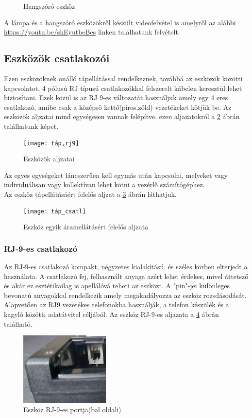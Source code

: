 \documentclass[tocnopagenum]{thesis-ekf}
\theoremstyle{definition}
\theoremstyle{remark}
\begin{document}
\begin{figure}[H]
		\caption[Hangszóró eszköz]{Hangszóró eszköz}
		\label{fig:hangsz01}
	\end{figure}
A lámpa és a hangszóró eszközökről készült videofelvétel is amelyről az alábbi \url{https://youtu.be/shEyutbeBes} linken találhatunk felvételt.
	\subsection{Eszközök csatlakozói}
	\label{eszkozcsatlakozok}
	Ezen eszközöknek önálló tápellátással rendelkeznek, továbbá az eszközök közötti kapcsolatot, 4 pólusú RJ típusú csatlakozókkal felszerelt kábelen keresztül lehet biztosítani. Ezek közül is az RJ 9-es változatát használjuk amely egy 4 eres csatlakozó, amibe csak a középső kettő(piros,zöld) vezetékeket kötjük be.
	Az eszközök aljzatai mind egységesen vannak felépítve, ezen aljazatokról a \ref{fig:csatlakozo} ábrán találhatunk képet.
	\begin{figure}[h!]	
		\centering
		\texttt{[image: táp,rj9]}
		\caption[Eszközök aljzatai]{Eszközök aljzatai}
		\label{fig:csatlakozo}
	\end{figure}
	\newpage
	Az egyes egységeket láncszerűen kell egymás után kapcsolni, melyeket vagy individuálisan vagy kollektívan lehet kötni a vezérlő számítógéphez. 	\\
	Az eszköz tápellátásáért felelős aljzat a \ref{fig:tápcsatl} ábrán láthatjuk.
	\begin{figure}[H]	
		\centering
		\texttt{[image: táp\_csatl]}
		\caption[Eszköz egyik áramellátásért felelős aljzata]{Eszköz egyik áramellátásért felelős aljzata}
		\label{fig:tápcsatl}
	\end{figure}
	
	\subsubsection{RJ-9-es csatlakozó}
	Az RJ-9-es csatlakozó kompakt, négyzetes kialakítású, és széles körben elterjedt a használata. A csatlakozó fej, felhasznált anyaga azért lehet érdekes, mivel áttetsző és akár ez esztétikailag is apellálóvá teheti az eszközt.
	A "pin"-jei különleges bevonatú anyagokkal rendelkezik amely megakadályozza az eszköz rozsdásodását. \cite{rj9Pros}
	Alapvetően az RJ9 vezetékes telefonokba használják, a telefon készülék és a kagyló közötti adatátvitel céljából.\cite{RJ9ok}
	Az eszköz RJ-9-es aljazata a \ref{fig:rj9csatl} ábrán található.
	\\
	\begin{figure}[H]	
		\centering
		\includegraphics[page=1,width=0.4\textwidth]{rj9_csatl}
		\caption[Eszközök bemeneti portjai]{Eszköz RJ-9-es portja(bal oldali)}
		\label{fig:rj9csatl}
	\end{figure}
\newpage
\end{document}
